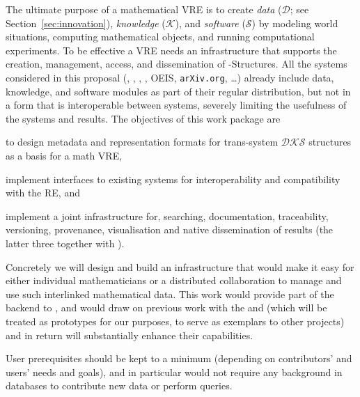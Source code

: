 \begin{workpackage}[id=dksbases,%
  title=Data/Knowledge/Software-Bases,lead=JU,
  ZHRM=12,JURM=46,UWRM=25,SARM=10,LLRM=2,PSRM=4]

\begin{wpobjectives}
  The ultimate purpose of a mathematical VRE is to create \emph{data} ($\mathcal{D}$; see
  Section~\ref{sec:innovation}), \emph{knowledge} ($\mathcal{K}$), and \emph{software} ($\mathcal{S}$)
  by modeling world situations, computing mathematical objects, and running
  computational experiments. To be effective a VRE needs an infrastructure that supports
  the creation, management, access, and dissemination of \DKS-Structures.  All
  the systems considered in this proposal (\GAP, \Sage, \Pari, \Singular, OEIS, \texttt{arXiv.org},
  \ldots) already include data, knowledge, and software modules as part of their regular
  distribution, but not in a form that is interoperable between systems, severely limiting
  the usefulness of the systems and results. The objectives of this work package are
\begin{compactenum}
\item to design metadata and representation formats for trans-system $\mathcal{DKS}$
  structures as a basis for a math VRE, 
\item implement interfaces to existing systems for interoperability and compatibility with
  the RE, and
\item implement a joint \DKS infrastructure for, searching, documentation, traceability,
  versioning, provenance, visualisation and native dissemination of \TheProject results
  (the latter three together with ).
\end{compactenum}
Concretely we will design and build an infrastructure that would make it easy for either
individual mathematicians or a distributed collaboration to manage and use such
interlinked mathematical data. This work would provide part of the backend to ,
and would draw on previous work with the \LMFDB and \FindStat (which will be treated as
prototypes for our purposes, to serve as exemplars to other projects) and in return will
substantially enhance their capabilities.

User prerequisites should be kept to a minimum (depending on contributors' and users'
needs and goals), and in particular would not require any background in databases to
contribute new data or perform queries.
\end{wpobjectives}


\end{workpackage}
